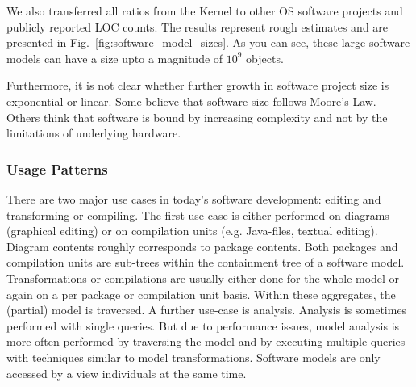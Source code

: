 We also transferred all ratios from the Kernel to other OS software projects and publicly reported LOC counts. The results represent rough estimates and are presented in Fig.~\ref{fig:software_model_sizes}. As you can see, these large software models can have a size upto a magnitude of $10^9$ objects.

Furthermore, it is not clear whether further growth in software project size is exponential or linear. Some believe that software size follows Moore's Law. Others think that software is bound by increasing complexity and not by the limitations of underlying hardware.

\subsubsection*{Usage Patterns}
There are two major use cases in today's software development: editing and transforming or compiling. The first use case is either performed on diagrams (graphical editing) or on compilation units (e.g. Java-files, textual editing). Diagram contents roughly corresponds to package contents. Both packages and compilation units are sub-trees within the containment tree of a software model.  Transformations or compilations are usually either done for the whole model or again on a per package or compilation unit basis. Within these aggregates, the (partial) model is traversed. A further use-case is analysis. Analysis is sometimes performed with single queries. But due to performance issues, model analysis is more often performed by traversing the model and by executing multiple queries with techniques similar to model transformations. Software models are only accessed by a view individuals at the same time.

